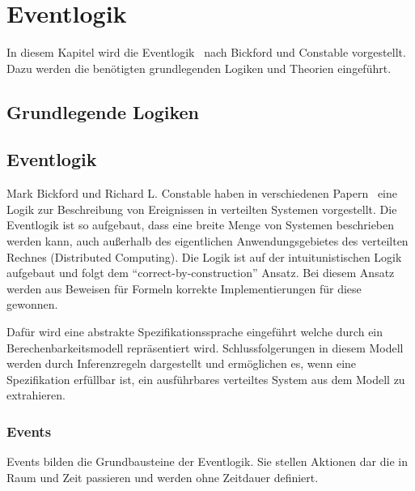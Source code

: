 
\section{Eventlogik}
\label{sec_logik}

In diesem Kapitel wird die Eventlogik~\cite{bickford2003logic} nach Bickford und
Constable vorgestellt. Dazu werden die benötigten grundlegenden Logiken
und Theorien eingeführt.

\subsection{Grundlegende Logiken}

\subsection{Eventlogik}

Mark Bickford und Richard L. Constable haben in verschiedenen
Papern~\cite{bickford2003logic, bickford2005causal, bickford2009component} eine Logik zur Beschreibung
von Ereignissen in verteilten Systemen vorgestellt. Die Eventlogik ist so
aufgebaut, dass eine breite Menge von Systemen beschrieben werden kann, auch
außerhalb des eigentlichen Anwendungsgebietes des verteilten Rechnes
(Distributed Computing).  Die Logik ist auf der
intuitunistischen Logik aufgebaut und folgt dem ``correct-by-construction''
Ansatz. Bei diesem Ansatz werden aus Beweisen für Formeln korrekte Implementierungen für
diese gewonnen.~\cite{bates1985proofs}

Dafür wird eine abstrakte Spezifikationssprache eingeführt welche durch
ein Berechenbarkeitsmodell repräsentiert wird.
Schlussfolgerungen in diesem Modell werden durch Inferenzregeln dargestellt und
ermöglichen es, wenn eine Spezifikation erfüllbar ist, ein ausführbares
verteiltes System aus dem Modell zu extrahieren.~\cite{bickford2005causal}

\subsubsection{Events}
Events bilden die Grundbausteine der Eventlogik.
Sie stellen Aktionen dar die in Raum und Zeit passieren und
werden ohne Zeitdauer definiert.~\cite{bickford2005causal}

